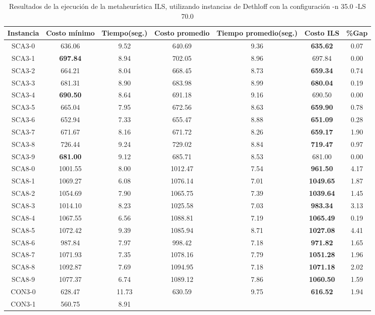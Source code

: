 \begin{table}[ht]
\caption{Resultados de la ejecución de la metaheurística ILS, utilizando instancias de Dethloff con la configuración -n 35.0 -LS 70.0}
\centering
\small
\begin{tabular}{c c c c c c c}
\hline\hline
Instancia & Costo mínimo & Tiempo(seg.) & Costo promedio & Tiempo promedio(seg.) & Costo ILS & \%Gap \\ [0.5ex]
\hline
SCA3-0 & 636.06 & 9.52 & 
640.69 & 9.36 & \bf{635.62} & 
0.07\\SCA3-1 & \bf{697.84} & 8.94 & 
702.05 & 8.96 & 697.84 & 0.00\\
SCA3-2 & 664.21 & 8.04 & 
668.45 & 8.73 & \bf{659.34} & 
0.74\\SCA3-3 & 681.31 & 8.90 & 
683.98 & 8.99 & \bf{680.04} & 
0.19\\SCA3-4 & \bf{690.50} & 8.64 & 
691.18 & 9.16 & 690.50 & 0.00\\
SCA3-5 & 665.04 & 7.95 & 
672.56 & 8.63 & \bf{659.90} & 
0.78\\SCA3-6 & 652.94 & 7.33 & 
655.47 & 8.88 & \bf{651.09} & 
0.28\\SCA3-7 & 671.67 & 8.16 & 
671.72 & 8.26 & \bf{659.17} & 
1.90\\SCA3-8 & 726.44 & 9.24 & 
729.02 & 8.84 & \bf{719.47} & 
0.97\\SCA3-9 & \bf{681.00} & 9.12 & 
685.71 & 8.53 & 681.00 & 0.00\\
SCA8-0 & 1001.55 & 8.00 & 
1012.47 & 7.54 & \bf{961.50} & 
4.17\\SCA8-1 & 1069.27 & 6.08 & 
1076.14 & 7.01 & \bf{1049.65} & 
1.87\\SCA8-2 & 1054.69 & 7.90 & 
1065.75 & 7.39 & \bf{1039.64} & 
1.45\\SCA8-3 & 1014.10 & 8.23 & 
1025.58 & 7.03 & \bf{983.34} & 
3.13\\SCA8-4 & 1067.55 & 6.56 & 
1088.81 & 7.19 & \bf{1065.49} & 
0.19\\SCA8-5 & 1072.42 & 9.39 & 
1085.94 & 8.71 & \bf{1027.08} & 
4.41\\SCA8-6 & 987.84 & 7.97 & 
998.42 & 7.18 & \bf{971.82} & 
1.65\\SCA8-7 & 1071.93 & 7.35 & 
1078.16 & 7.79 & \bf{1051.28} & 
1.96\\SCA8-8 & 1092.87 & 7.69 & 
1094.95 & 7.18 & \bf{1071.18} & 
2.02\\SCA8-9 & 1077.37 & 6.74 & 
1089.12 & 7.86 & \bf{1060.50} & 
1.59\\CON3-0 & 628.47 & 11.73 & 
630.59 & 9.75 & \bf{616.52} & 
1.94\\CON3-1 & 560.75 & 8.91 & 

\end{tabular}
\end{table}
